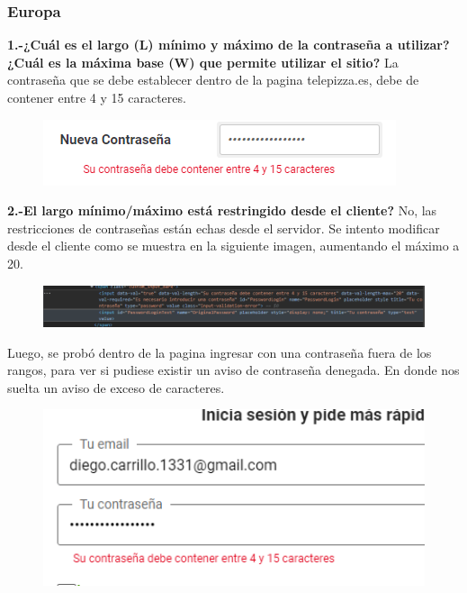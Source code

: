 \documentclass{article}
\begin{document}
\newpage
\subsubsection{Europa}
\textbf{1.-¿Cuál es el largo (L) mínimo y máximo de la contraseña a utilizar? ¿Cuál es la máxima base (W) que permite utilizar el sitio? }
\newline
La contraseña que se debe establecer dentro de la pagina telepizza.es, debe de contener entre 4 y 15 caracteres.
\begin{figure}[h!]
    \centering
    \includegraphics[]{PASSLARGEU.PNG}
\end{figure}
\newline
\textbf{2.-El largo mínimo/máximo está restringido desde el cliente?}
\newline
No, las restricciones de contraseñas están echas desde el servidor. Se intento modificar desde el cliente como se muestra en la siguiente imagen, aumentando el máximo a 20.
\begin{figure}[h!]
    \centering
    \includegraphics[width=15cm]{passcliente1.PNG}
\end{figure}
\newline
Luego, se probó dentro de la pagina ingresar con una contraseña fuera de los rangos, para ver si pudiese existir un aviso de contraseña denegada. En donde nos suelta un aviso de exceso de caracteres.
\begin{figure}[h!]
    \centering
    \includegraphics[width=12cm]{passcliente2.PNG}
\end{figure}
\end{document}
